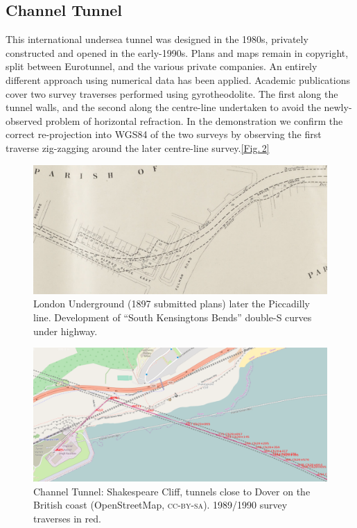 \documentclass[conference,a4paper]{IEEEtran}
\begin{document}
\vspace{-1.7em}\subsection{Channel Tunnel}\vspace{-0.2em}

This international undersea tunnel was designed in the 1980s,
privately constructed and opened in the early-1990s.  Plans and maps
remain in copyright, split between Eurotunnel, and the various private
companies.  An entirely different approach using numerical data has
been applied.\cite{osm-wiki-chunnel}\nocite{sladen-sotm2013} Academic publications cover two
survey traverses performed using gyrotheodolite.\cite{korittke-1997}
The first along the tunnel walls, and the second along the centre-line
undertaken to avoid the newly-observed problem of horizontal
refraction.\cite{korittke-1989}\hspace{3em} In the demonstration we confirm the
correct re-projection into WGS84 of the two surveys by observing the
first traverse zig-zagging around the later centre-line survey.\hfill\hyperref[fig:osm-chunnel-traverse]{[Fig.\,2]}

\begin{figure}[!lt]
  \centering
  \includegraphics[width=15.1cm]{reverse-curves-cropped}
  \vspace{-0.5em}
  \caption{London Underground (1897 submitted plans) later the Piccadilly line.  Development of ``South Kensingtons Bends'' double-S curves under highway.}
  \label{fig:south-ken-bends}
\end{figure}
\vspace{-1em}
\begin{figure}[!lt]
  \centering
  \includegraphics[width=15.1cm]{shakespeare-cliff-cropped}
  \vspace{-0.5em}
  \caption{Channel Tunnel: Shakespeare Cliff, tunnels close to Dover on the British coast (OpenStreetMap, \textsc{cc-by-sa}). 1989/1990 survey traverses in red.}
  \label{fig:osm-chunnel-traverse}
\end{figure}




\end{document}
